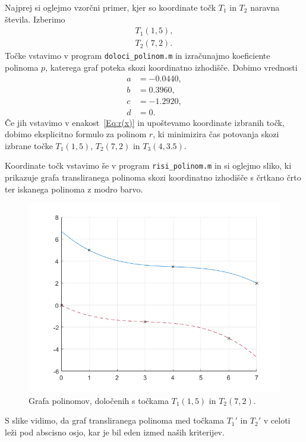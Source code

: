 \documentclass[a4paper]{article}
\begin{document}
Najprej si oglejmo vzorčni primer, kjer so koordinate točk $T_1$ in $T_2$ naravna števila. Izberimo
\begin{align*}
T_1(1,5), \\
T_2(7,2).
\end{align*}
%
Točke vstavimo v program \texttt{doloci\_polinom.m} in izračunajmo koeficiente polinoma $p$, katerega graf poteka skozi koordinatno izhodišče. Dobimo vrednosti
\begin{align*}
a &= -0.0440, \\
b &= 0.3960, \\
c &= -1.2920, \\
d &= 0.
\end{align*}
%
Če jih vstavimo v enakost~\eqref{Eq:r(x)} in upoštevamo koordinate izbranih točk, dobimo eksplicitno formulo za polinom $r$, ki minimizira čas potovanja skozi izbrane točke $T_1(1,5)$, $T_2(7,2)$ in $T_3(4,3.5)$.

Koordinate točk vstavimo še v program \texttt{risi\_polinom.m} in si oglejmo sliko, ki prikazuje grafa transliranega polinoma skozi koordinatno izhodišče s črtkano črto ter iskanega polinoma z modro barvo.
\begin{figure}[h!]
\begin{center}
\includegraphics[scale=0.52]{primer2-polinom.png}
\caption{Grafa polinomov, določenih s točkama $T_1(1,5)$ in $T_2(7,2)$.}
\end{center}
\end{figure}
%
S slike vidimo, da graf transliranega polinoma med točkama $T_{1}'$ in $T_{2}'$ v celoti leži pod abscisno osjo, kar je bil eden izmed naših kriterijev.
\end{document}

